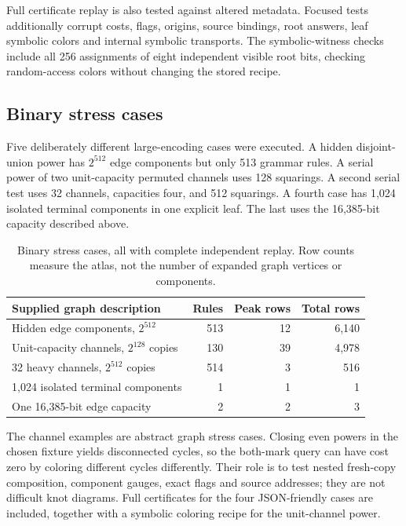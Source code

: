 \documentclass[11pt,letterpaper]{article}
\theoremstyle{definition}
\theoremstyle{remark}\newtheorem{remark}[theorem]{Remark}
\begin{document}
Full certificate replay is also tested against altered metadata. Focused tests additionally corrupt costs, flags, origins, source bindings, root answers, leaf symbolic colors and internal symbolic transports. The symbolic-witness checks include all 256 assignments of eight independent visible root bits, checking random-access colors without changing the stored recipe.

\subsection{Binary stress cases}
Five deliberately different large-encoding cases were executed. A hidden disjoint-union power has $2^{512}$ edge components but only 513 grammar rules. A serial power of two unit-capacity permuted channels uses 128 squarings. A second serial test uses 32 channels, capacities four, and 512 squarings. A fourth case has 1,024 isolated terminal components in one explicit leaf. The last uses the 16,385-bit capacity described above.

\begin{table}[htbp]
\centering\small
\begin{tabular}{@{}lrrr@{}}
\toprule
Supplied graph description & Rules & Peak rows & Total rows\\
\midrule
Hidden edge components, $2^{512}$ & 513 & 12 & 6,140\\
Unit-capacity channels, $2^{128}$ copies & 130 & 39 & 4,978\\
32 heavy channels, $2^{512}$ copies & 514 & 3 & 516\\
1,024 isolated terminal components & 1 & 1 & 1\\
One 16,385-bit edge capacity & 2 & 2 & 3\\
\bottomrule
\end{tabular}
\caption{Binary stress cases, all with complete independent replay. Row counts measure the atlas, not the number of expanded graph vertices or components.}
\label{tab:stress}
\end{table}

The channel examples are abstract graph stress cases. Closing even powers in the chosen fixture yields disconnected cycles, so the both-mark query can have cost zero by coloring different cycles differently. Their role is to test nested fresh-copy composition, component gauges, exact flags and source addresses; they are not difficult knot diagrams. Full certificates for the four JSON-friendly cases are included, together with a symbolic coloring recipe for the unit-channel power.
\end{document}
